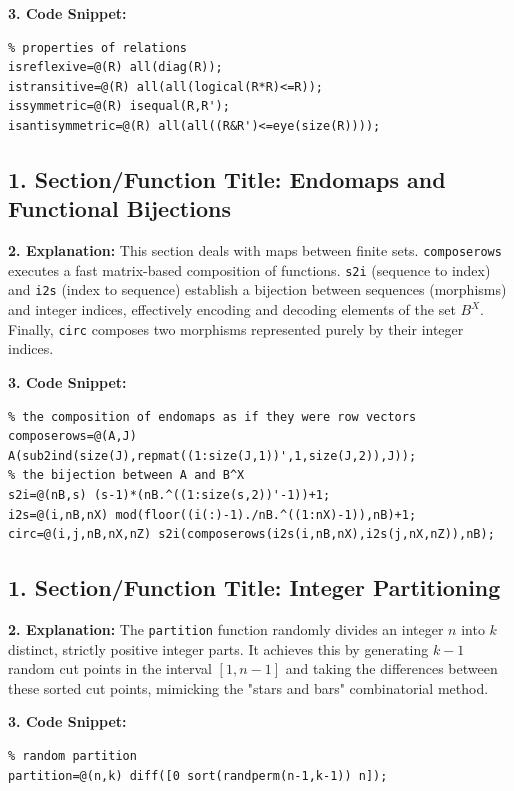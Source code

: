 \textbf{3. Code Snippet:}
\begin{lstlisting}
% properties of relations
isreflexive=@(R) all(diag(R));
istransitive=@(R) all(all(logical(R*R)<=R));
issymmetric=@(R) isequal(R,R');
isantisymmetric=@(R) all(all((R&R')<=eye(size(R))));
\end{lstlisting}

\subsection{1. Section/Function Title: Endomaps and Functional Bijections}
\textbf{2. Explanation:} This section deals with maps between finite sets. \texttt{composerows} executes a fast matrix-based composition of functions. \texttt{s2i} (sequence to index) and \texttt{i2s} (index to sequence) establish a bijection between sequences (morphisms) and integer indices, effectively encoding and decoding elements of the set $B^X$. Finally, \texttt{circ} composes two morphisms represented purely by their integer indices.

\textbf{3. Code Snippet:}
\begin{lstlisting}
% the composition of endomaps as if they were row vectors
composerows=@(A,J) A(sub2ind(size(J),repmat((1:size(J,1))',1,size(J,2)),J));
% the bijection between A and B^X
s2i=@(nB,s) (s-1)*(nB.^((1:size(s,2))'-1))+1; 
i2s=@(i,nB,nX) mod(floor((i(:)-1)./nB.^((1:nX)-1)),nB)+1; 
circ=@(i,j,nB,nX,nZ) s2i(composerows(i2s(i,nB,nX),i2s(j,nX,nZ)),nB); 
\end{lstlisting}

\subsection{1. Section/Function Title: Integer Partitioning}
\textbf{2. Explanation:} The \texttt{partition} function randomly divides an integer $n$ into $k$ distinct, strictly positive integer parts. It achieves this by generating $k-1$ random cut points in the interval $[1, n-1]$ and taking the differences between these sorted cut points, mimicking the "stars and bars" combinatorial method.

\textbf{3. Code Snippet:}
\begin{lstlisting}
% random partition 
partition=@(n,k) diff([0 sort(randperm(n-1,k-1)) n]); 
\end{lstlisting}


